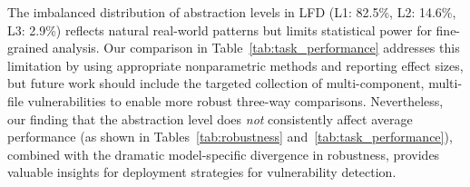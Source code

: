 \documentclass[lettersize,journal]{IEEEtran}
\begin{document}
The imbalanced distribution of abstraction levels in LFD (L1: 82.5\%, L2: 14.6\%, L3: 2.9\%) reflects natural real-world patterns but limits statistical power for fine-grained analysis. Our comparison in Table~\ref{tab:task_performance} addresses this limitation by using appropriate nonparametric methods and reporting effect sizes, but future work should include the targeted collection of multi-component, multi-file vulnerabilities to enable more robust three-way comparisons. Nevertheless, our finding that the abstraction level does \textit{not} consistently affect average performance (as shown in Tables~\ref{tab:robustness} and~\ref{tab:task_performance}), combined with the dramatic model-specific divergence in robustness, provides valuable insights for deployment strategies for vulnerability detection.


\end{document}
